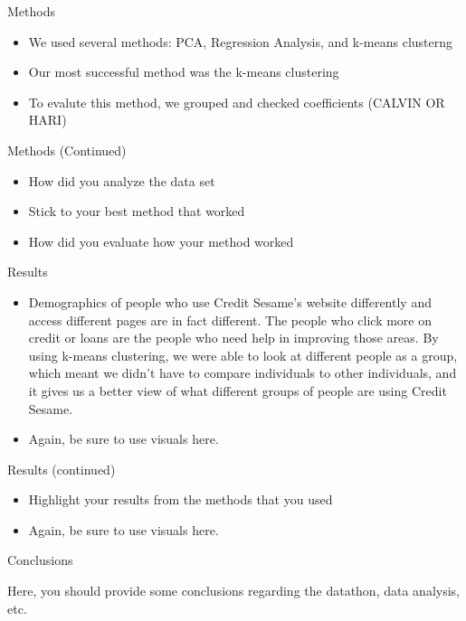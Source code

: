 \documentclass[ignorenonframetext,]{beamer}
\providecommand{\tightlist}{%
  \setlength{\itemsep}{0pt}\setlength{\parskip}{0pt}}
\begin{document}
\begin{frame}{Methods}

\begin{itemize}
\tightlist
\item
  We used several methods: PCA, Regression Analysis, and k-means
  clusterng
\item
  Our most successful method was the k-means clustering
\item
  To evalute this method, we grouped and checked coefficients (CALVIN OR
  HARI)
\end{itemize}

\end{frame}

\begin{frame}{Methods (Continued)}

\begin{itemize}
\tightlist
\item
  How did you analyze the data set
\item
  Stick to your best method that worked
\item
  How did you evaluate how your method worked
\end{itemize}

\end{frame}

\begin{frame}{Results}

\begin{itemize}
\tightlist
\item
  Demographics of people who use Credit Sesame's website differently and
  access different pages are in fact different. The people who click
  more on credit or loans are the people who need help in improving
  those areas. By using k-means clustering, we were able to look at
  different people as a group, which meant we didn't have to compare
  individuals to other individuals, and it gives us a better view of
  what different groups of people are using Credit Sesame.
\item
  Again, be sure to use visuals here.
\end{itemize}

\end{frame}

\begin{frame}{Results (continued)}

\begin{itemize}
\tightlist
\item
  Highlight your results from the methods that you used
\item
  Again, be sure to use visuals here.
\end{itemize}

\end{frame}

\begin{frame}{Conclusions}

Here, you should provide some conclusions regarding the datathon, data
analysis, etc.

\end{frame}
\end{document}
